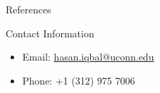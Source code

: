 \documentclass[final]{beamer}
\newlength{\onecolwid}
\begin{document}
\begin{frame}[t]
\begin{columns}[t]
\begin{column}{\onecolwid}

\begin{block}{References}

\nocite{*} %
\small{
\vspace{0.75in}}

\end{block}


%
%
%



\begin{alertblock}{Contact Information}

\begin{itemize}
\item Email: \href{mailto:hasan.iqbal@uconn.edu}{hasan.iqbal@uconn.edu}
\item Phone: +1 (312) 975 7006
\end{itemize}

\end{alertblock}



\end{column} %

\end{columns} %

\end{frame} %
\end{document}

